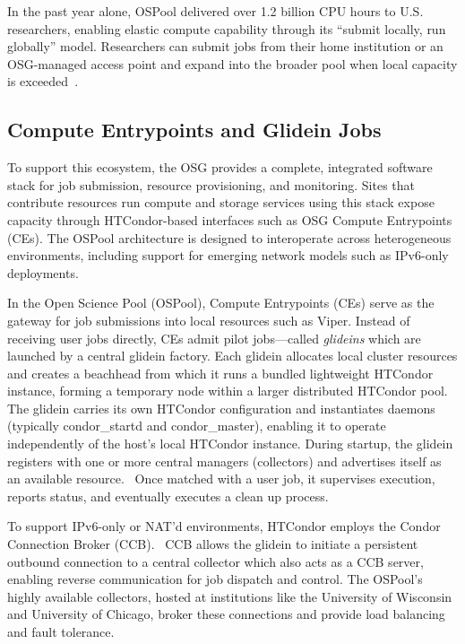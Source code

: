 \documentclass[11pt]{article}
\begin{document}
In the past year alone, OSPool delivered over 1.2 billion CPU hours to U.S. researchers, enabling elastic compute capability through its “submit locally, run globally” model. Researchers can submit jobs from their home institution or an OSG-managed access point and expand into the broader pool when local capacity is exceeded~\cite{ospoolutil}.


\subsection{Compute Entrypoints and Glidein Jobs}
To support this ecosystem, the OSG provides a complete, integrated software stack for job submission, resource provisioning, and monitoring. Sites that contribute resources run compute and storage services using this stack expose capacity through HTCondor-based interfaces such as OSG Compute Entrypoints (CEs). The OSPool architecture is designed to interoperate across heterogeneous environments, including support for emerging network models such as IPv6-only deployments.

In the Open Science Pool (OSPool), Compute Entrypoints (CEs) serve as the gateway for job submissions into local resources such as Viper. Instead of receiving  user jobs directly, CEs admit pilot jobs—called {\it glideins} which are launched by a central glidein factory. Each glidein allocates local cluster resources and creates a beachhead from which it runs a bundled lightweight HTCondor instance, forming a temporary node within a larger distributed HTCondor pool. The glidein carries its own HTCondor configuration and instantiates daemons (typically condor\_startd and condor\_master), enabling it to operate independently of the host's local HTCondor instance. During startup, the glidein registers with one or more central managers (collectors) and advertises itself as an available resource.~\cite{htcondor,glideinwms} Once matched with a user job, it supervises execution, reports status, and eventually executes a clean up process. 

To support IPv6-only or NAT'd environments, HTCondor employs the Condor Connection Broker (CCB).~\cite{ccbdesign} CCB allows the glidein to initiate a persistent outbound connection to a central collector which also acts as a CCB server, enabling reverse communication for job dispatch and control. The OSPool's highly available collectors, hosted at institutions like the University of Wisconsin and University of Chicago, broker these connections and provide load balancing and fault tolerance.
\end{document}

